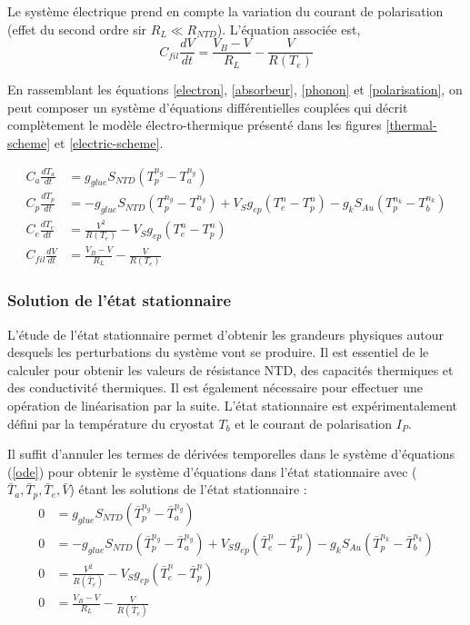 Le système électrique prend en compte la variation du courant de polarisation (effet du second ordre sir $R_L\ll R_{NTD}$). L'équation associée est,
\begin{equation}
\label{polarisation}
C_{fil} \frac{d V}{d t} = \frac{V_B - V}{R_L} - \frac{V}{R(T_e)}
\end{equation}

En rassemblant les équations \ref{electron}, \ref{absorbeur}, \ref{phonon} et \ref{polarisation}, on peut composer un système d'équations différentielles couplées qui décrit complètement le modèle électro-thermique présenté dans les figures \ref{thermal-scheme} et \ref{electric-scheme}.

\begin{align}
\label{ode}
 C_a \frac{d T_a}{d t} &= g_{glue} S_{NTD} \left( T_p^{n_g} - T_a^{n_g} \right) \nonumber \\ 
 C_p \frac{d T_p}{d t} &= -g_{glue} S_{NTD} \left( T_p^{n_g} - T_a^{n_g} \right)  + V_S g_{ep} \left( T_e^{n} - T_p^{n} \right) - g_k S_{Au} \left( T_p^{n_k} - T_b^{n_k} \right) \nonumber \\ 
 C_e \frac{d T_e}{d t} &= \frac{V^2}{R(T_e)} - V_S g_{ep} \left( T_e^{n} - T_p^{n} \right) \nonumber \\ 
 C_{fil} \frac{d V}{d t} &= \frac{V_B - V}{R_L} - \frac{V}{R(T_e)}
\end{align}

\subsubsection{Solution de l'état stationnaire}
\label{steady-section}

L'étude de l'état stationnaire permet d'obtenir les grandeurs physiques autour desquels les perturbations du système vont se produire. Il est essentiel de le calculer pour obtenir les valeurs de résistance NTD, des capacités thermiques et des conductivité thermiques. Il est également nécessaire pour effectuer une opération de linéarisation par la suite. L'état stationnaire est expérimentalement défini par la température du cryostat $T_b$ et le courant de polarisation $I_P$. 

Il suffit d'annuler les termes de dérivées temporelles dans le système d'équations (\ref{ode}) pour obtenir le système d'équations dans l'état stationnaire avec ($\bar{T}_a, \bar{T}_p, \bar{T}_e, \bar{V}$) étant les solutions de l'état stationnaire :
\begin{align}
\label{steady}
0 &= g_{glue} S_{NTD} \left( \bar{T}_p^{n_g} - \bar{T}_a^{n_g} \right) \nonumber \\
0 &= -g_{glue} S_{NTD} \left( \bar{T}_p^{n_g} - \bar{T}_a^{n_g} \right) + V_S  g_{ep} \left( \bar{T}_e^{n} - \bar{T}_p^{n} \right) - g_k S_{Au} \left( \bar{T}_p^{n_k} - \bar{T}_b^{n_k} \right) \nonumber \\
0 &= \frac{V^2}{R(\bar{T}_e)} - V_S g_{ep} \left( \bar{T}_e^{n} - \bar{T}_p^{n} \right) \nonumber \\
0 &= \frac{V_B - V}{R_L} - \frac{V}{R(\bar{T}_e)}
\end{align}


